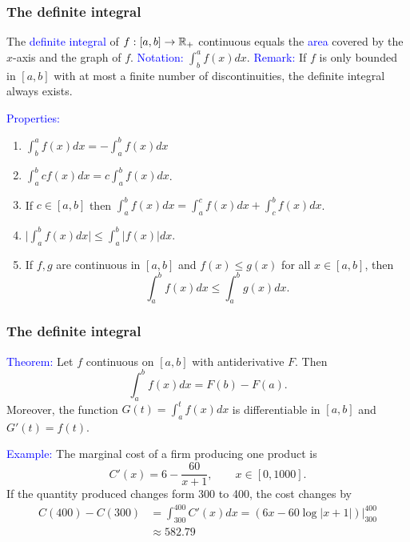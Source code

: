 \documentclass[11pt,aspectratio=169]{beamer}
\begin{document}
\begin{frame}
\frametitle{The definite integral}
\begin{small}
The \textcolor{blue}{definite integral} of $f:[a,b] \rightarrow \mathbb R_+$ continuous equals the 
\textcolor{blue}{area} covered by the $x$-axis and the graph of $f$.
\vskip 12pt
 \textcolor{blue}{Notation:} $\int_b^a f(x) dx.$ \textcolor{blue}{Remark:} If $f$ is only bounded in $[a,b]$ with at most a finite number of discontinuities, the definite integral always exists.
 




 \textcolor{blue}{Properties:} 
\begin{enumerate}
\item $\int_b^a f(x) dx=- \int_a^b f(x) dx $

\item  $\int_a^b cf(x) dx=c \int_a^b f(x) dx$.

\item If $c \in [a,b]$ then $\int_a^b f(x) dx= \int_a^c f(x) dx +\int_c^b f(x) dx$.
\item $\big\vert \int_a^b f(x) dx\big\vert \leq \int_a^b \vert f(x) \vert dx$.
\item If $f,g$ are continuous in $[a,b]$ and $f(x) \leq g(x)$ for all $x \in [a,b]$, then
$$
\int_a^b f(x) dx\leq \int_a^b g(x) dx.
$$
\end{enumerate}



\end{small}
\end{frame}\begin{frame}
\frametitle{The definite integral}
\begin{small}
\textcolor{blue}{Theorem:} Let $f$ continuous on $[a,b]$ with antiderivative $F$. Then 
$$
\int_a^b f(x) dx=F(b)-F(a).
$$
Moreover, the function $G(t)=\int_a^t f(x) dx$ is differentiable in $[a,b]$ and
$G'(t)=f(t)$. 
\vskip 12pt

\textcolor{blue}{Example:} The marginal cost of a firm producing one product is
$$
C'(x)=6-\frac{60}{x+1}, \qquad x \in [0,1000].
$$
If the quantity produced changes form 300 to 400, the cost changes by
\begin{equation*}
\begin{split}
C(400)-C(300)&=\int_{300}^{400} C'(x) dx=(6x-60\log \vert x+1 \vert) \bigg\vert_{300}^{400} \\
&\approx 582.79
\end{split}
\end{equation*}


\end{small}
\end{frame}
\end{document}
